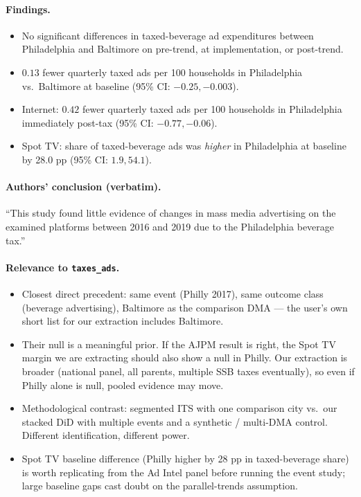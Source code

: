 \paragraph{Findings.}
\begin{itemize}
  \item No significant differences in taxed-beverage ad
        expenditures between Philadelphia and Baltimore on
        pre-trend, at implementation, or post-trend.
  \item $0.13$ fewer quarterly taxed ads per 100 households in
        Philadelphia vs.\ Baltimore at baseline (95\% CI:
        $-0.25, -0.003$).
  \item Internet: $0.42$ fewer quarterly taxed ads per 100
        households in Philadelphia immediately post-tax (95\%
        CI: $-0.77, -0.06$).
  \item Spot TV: share of taxed-beverage ads was \emph{higher}
        in Philadelphia at baseline by 28.0 pp (95\% CI:
        $1.9, 54.1$).
\end{itemize}

\paragraph{Authors' conclusion (verbatim).}
``This study found little evidence of changes in mass media
advertising on the examined platforms between 2016 and 2019
due to the Philadelphia beverage tax.''

\paragraph{Relevance to \texttt{taxes\_ads}.}
\begin{itemize}
  \item Closest direct precedent: same event (Philly 2017),
        same outcome class (beverage advertising), Baltimore
        as the comparison DMA --- the user's own short list
        for our extraction includes Baltimore.
  \item Their null is a meaningful prior. If the AJPM result
        is right, the Spot TV margin we are extracting should
        also show a null in Philly. Our extraction is broader
        (national panel, all parents, multiple SSB taxes
        eventually), so even if Philly alone is null, pooled
        evidence may move.
  \item Methodological contrast: segmented ITS with one
        comparison city vs.\ our stacked DiD with multiple
        events and a synthetic / multi-DMA control. Different
        identification, different power.
  \item Spot TV baseline difference (Philly higher by 28 pp in
        taxed-beverage share) is worth replicating from the
        Ad Intel panel before running the event study; large
        baseline gaps cast doubt on the parallel-trends
        assumption.
\end{itemize}

